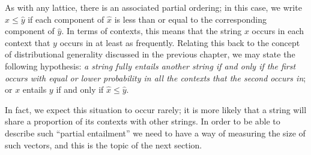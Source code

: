 As with any lattice, there is an associated partial ordering; in this case, we write $\hat{x} \le \hat{y}$ if each component of $\hat{x}$ is less than or equal to the corresponding component of $\hat{y}$. In terms of contexts, this means that the string $x$ occurs in each context that $y$ occurs in at least as frequently. Relating this back to the concept of distributional generality discussed in the previous chapter, we may state the following hypothesis: \emph{a string fully entails another string if and only if the first occurs with equal or lower probability in all the contexts that the second occurs in}; or $x$ entails $y$ if and only if $\hat{x} \le \hat{y}$.

In fact, we expect this situation to occur rarely; it is more likely that a string will share a proportion of its contexts with other strings. In order to be able to describe such ``partial entailment'' we need to have a way of measuring the size of such vectors, and this is the topic of the next section.



